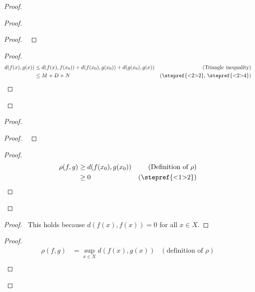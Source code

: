 \begin{proof}
  \pf
  \begin{proof}
    \begin{proof}
      \pf\ 
    \end{proof}
    \begin{proof}
      \pf
      \begin{align*}
        d(f(x), g(x)) & \leq d(f(x), f(x_0)) + d(f(x_0), g(x_0)) + d(g(x_0), g(x)) & (\text{Triangle inequality}) \\
        & \leq M + D + N & (\text{\stepref{<2>2}, \stepref{<2>4}})
      \end{align*}
    \end{proof}
  \end{proof}
  \begin{proof}
    \begin{proof}
      \pf\ 
    \end{proof}
    \begin{proof}
      \pf
      \begin{align*}
        \rho(f, g) & \geq d(f(x_0), g(x_0)) & (\text{Definition of } \rho) \\
        & \geq 0 & (\text{\stepref{<1>2}})
      \end{align*}
    \end{proof}
  \end{proof}
  \begin{proof}
    \pf\ This holds because $d(f(x), f(x)) = 0$ for all $x \in X$.
  \end{proof}
  \begin{proof}
    \pf
    \begin{align*}
      \rho(f, g) & = \sup_{x \in X} d(f(x), g(x)) & (\text{definition of } \rho)\\

\end{align*}
\end{proof}
\end{proof}
